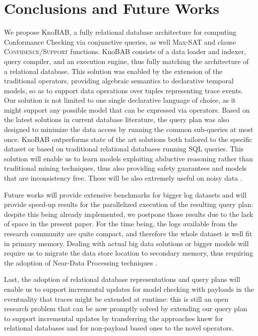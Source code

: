 \section{Conclusions and Future Works}
We propose KnoBAB, a fully relational database architecture for computing Conformance Checking via conjunctive queries, as well Max-SAT and clause \textsc{Confidence}/\textsc{Support} functions.  KnoBAB consists of a data loader and indexer, query compiler, and an execution engine, thus fully matching the architecture of a relational database. This solution was enabled by the extension of the traditional \LTLf operators, providing algebraic semantics to declarative temporal models, so as to support data operations over tuples representing trace  events. Our solution is not limited to one single declarative language of choice, as it might support any possible model that can be expressed via \xLTLf operators. Based on the latest solutions in current database literature, the query plan was also designed to minimize the data access by running the common sub-queries at most once.
%
KnoBAB outperforms state of the art solutions both tailored to the specific dataset or based on traditional relational databases running SQL queries.  This solution will enable us to learn models exploiting abductive reasoning rather than traditional mining techniques, thus also providing safety guarantees and models that are inconsistency free. These will be also extremely useful on  noisy data \cite{PicadoDTL20}.

Future works will provide extensive benchmarks for bigger log datasets and will provide speed-up results for the parallelized execution of the resulting query plan: despite this being already implemented, we postpone those results due to the lack of space in the present paper. For the time being, the logs available from the research community are quite compact, and therefore the whole dataset is well fit in primary memory. Dealing with actual big data solutions or bigger models will require us to migrate the data store location to secondary memory, thus requiring the adoption of Near-Data Processing techniques \cite{GuYBJLYKKYCJC16}. 

Last, 
the adoption of relational database representations and query plans will enable us to support incremental updates for model checking with payloads in the eventuality that traces might be extended at runtime: this is still an open research problem that can be now promptly solved by extending our query plan to support incremental updates by transferring the approaches knew for relational databases and for non-payload based ones \cite{Polyvyanyy2022} to the novel \xLTLf operators. 

